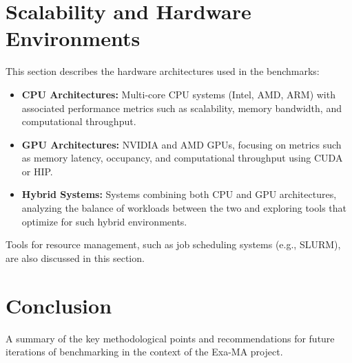 \section{Scalability and Hardware Environments}
\label{sec:methodology-environments}

This section describes the hardware architectures used in the benchmarks:
\begin{itemize}
    \item \textbf{CPU Architectures:} Multi-core CPU systems (Intel, AMD, ARM) with associated performance metrics such as scalability, memory bandwidth, and computational throughput.
    \item \textbf{GPU Architectures:} NVIDIA and AMD GPUs, focusing on metrics such as memory latency, occupancy, and computational throughput using CUDA or HIP.
    \item \textbf{Hybrid Systems:} Systems combining both CPU and GPU architectures, analyzing the balance of workloads between the two and exploring tools that optimize for such hybrid environments.
\end{itemize}
Tools for resource management, such as job scheduling systems (e.g., SLURM), are also discussed in this section.

\section{Conclusion}
\label{sec:methodology-conclusion}

A summary of the key methodological points and recommendations for future iterations of benchmarking in the context of the Exa-MA project.